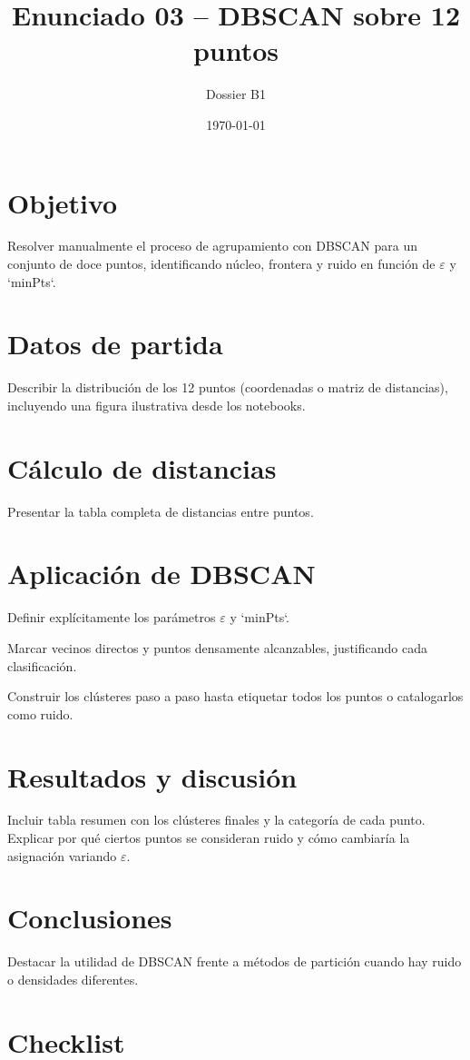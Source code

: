 \documentclass[12pt]{article}
\title{Enunciado 03 -- DBSCAN sobre 12 puntos}
\author{Dossier B1}
\date{\today}
\begin{document}
\maketitle
\section{Objetivo}
Resolver manualmente el proceso de agrupamiento con DBSCAN para un conjunto de doce puntos, identificando núcleo, frontera y ruido en función de $\varepsilon$ y `minPts`.

\section{Datos de partida}
Describir la distribución de los 12 puntos (coordenadas o matriz de distancias), incluyendo una figura ilustrativa desde los notebooks.

\section{Cálculo de distancias}
Presentar la tabla completa de distancias entre puntos.

\section{Aplicación de DBSCAN}
\begin{pasoapaso}
  \item Definir explícitamente los parámetros $\varepsilon$ y `minPts`.
  \item Marcar vecinos directos y puntos densamente alcanzables, justificando cada clasificación.
  \item Construir los clústeres paso a paso hasta etiquetar todos los puntos o catalogarlos como ruido.
\end{pasoapaso}

\section{Resultados y discusión}
Incluir tabla resumen con los clústeres finales y la categoría de cada punto. Explicar por qué ciertos puntos se consideran ruido y cómo cambiaría la asignación variando $\varepsilon$.

\section{Conclusiones}
Destacar la utilidad de DBSCAN frente a métodos de partición cuando hay ruido o densidades diferentes.

\section*{Checklist}
\ChecklistBase
\end{document}
